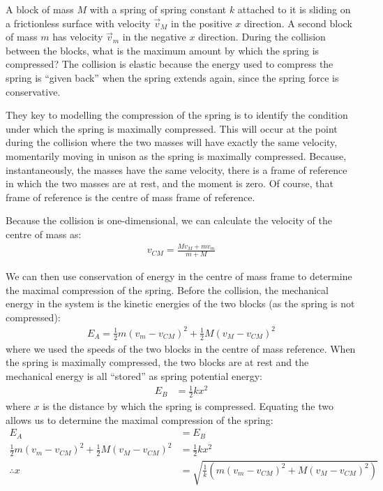 \begin{example}{ A block of mass $M$ with a spring of spring constant $k$ attached to it is sliding on a frictionless surface with velocity $\vec v_M$ in the positive $x$ direction. A second block of mass $m$ has velocity $\vec v_m$ in the negative $x$ direction. During the collision between the blocks, what is the maximum amount by which the spring is compressed?
}
The collision is elastic because the energy used to compress the spring is ``given back'' when the spring extends again, since the spring force is conservative. 

They key to modelling the compression of the spring is to identify the condition under which the spring is maximally compressed. This will occur at the point during the collision where the two masses will have exactly the same velocity, momentarily moving in unison as the spring is maximally compressed. Because, instantaneously, the masses have the same velocity, there is a frame of reference in which the two masses are at rest, and the moment is zero. Of course, that frame of reference is the centre of mass frame of reference. 

Because the collision is one-dimensional, we can calculate the velocity of the centre of mass as:
\begin{align*}
v_{CM} = \frac{Mv_M+mv_m}{m+M}
\end{align*}

We can then use conservation of energy in the centre of mass frame to determine the maximal compression of the spring. Before the collision, the mechanical energy in the system is the kinetic energies of the two blocks (as the spring is not compressed):
\begin{align*}
E_A=\frac{1}{2}m(v_m-v_{CM})^2+\frac{1}{2}M(v_M-v_{CM})^2
\end{align*}
where we used the speeds of the two blocks in the centre of mass reference. When the spring is maximally compressed, the two blocks are at rest and the mechanical energy is all ``stored'' as spring potential energy:
\begin{align*}
E_B&=\frac{1}{2}kx^2
\end{align*}
where $x$ is the distance by which the spring is compressed. Equating the two allows us to determine the maximal compression of the spring:
\begin{align*}
E_A &= E_B \\
\frac{1}{2}m(v_m-v_{CM})^2+\frac{1}{2}M(v_M-v_{CM})^2 &= \frac{1}{2}kx^2\\
\therefore x &= \sqrt{\frac{1}{k}(m(v_m-v_{CM})^2+M(v_M-v_{CM})^2) }
\end{align*}
\end{example}



